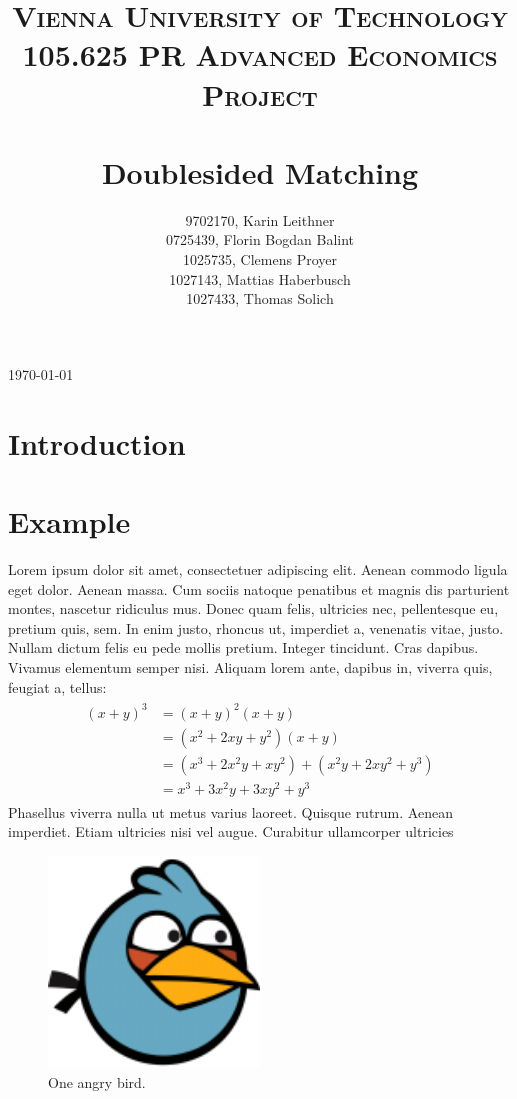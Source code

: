 \documentclass[11pt,english]{article}
\title{
	\usefont{OT1}{bch}{b}{n}
	\normalfont \normalsize \textsc{Vienna University of Technology} \\ [25pt]
	\normalfont \normalsize \textsc{105.625 PR Advanced Economics Project} \\ [25pt]
	\horrule{0.5pt} \\[0.4cm]
	\huge Doublesided Matching
	\horrule{2pt} \\[0.5cm]
}
\author{
  9702170, Karin Leithner\\
  0725439, Florin Bogdan Balint\\
  1025735, Clemens Proyer\\
  1027143, Mattias Haberbusch\\
  1027433, Thomas Solich\\
}
\numberwithin{equation}{section}		%
\numberwithin{figure}{section}			%
\numberwithin{table}{section}				%
\begin{document}
\begin{titlepage}
	\begin{center}
		\thetitle
		\vspace{2cm}
	\end{center}
	\begin{flushleft}
	\vfill
	\theauthor
	\end{flushleft}
	\begin{center}
		\vspace{2cm}
		{\large \today\par}
	\end{center}
\end{titlepage}

\tableofcontents
\newpage

\section{Introduction}


\section{Example}
Lorem\cite{Turing1936} ipsum dolor sit amet, consectetuer adipiscing elit. Aenean commodo ligula eget dolor. Aenean massa. Cum sociis natoque penatibus et magnis dis parturient montes, nascetur ridiculus mus. Donec quam felis, ultricies nec, pellentesque eu, pretium quis, sem. In enim justo, rhoncus ut, imperdiet a, venenatis vitae, justo. Nullam dictum felis eu pede mollis pretium. Integer tincidunt. Cras dapibus. Vivamus elementum semper nisi. Aliquam lorem ante, dapibus in, viverra quis, feugiat a, tellus:
\begin{align} 
	\begin{split}
	(x+y)^3 	&= (x+y)^2(x+y)\\
					&=(x^2+2xy+y^2)(x+y)\\
					&=(x^3+2x^2y+xy^2) + (x^2y+2xy^2+y^3)\\
					&=x^3+3x^2y+3xy^2+y^3
	\end{split}					
\end{align}
Phasellus viverra nulla ut metus varius laoreet. Quisque rutrum. Aenean imperdiet. Etiam ultricies nisi vel augue. Curabitur ullamcorper ultricies 

\begin{figure}[!ht]
  \caption{One angry bird.}
  \centering
    \includegraphics[width=0.5\textwidth]{image_example}
\end{figure}
\end{document}
